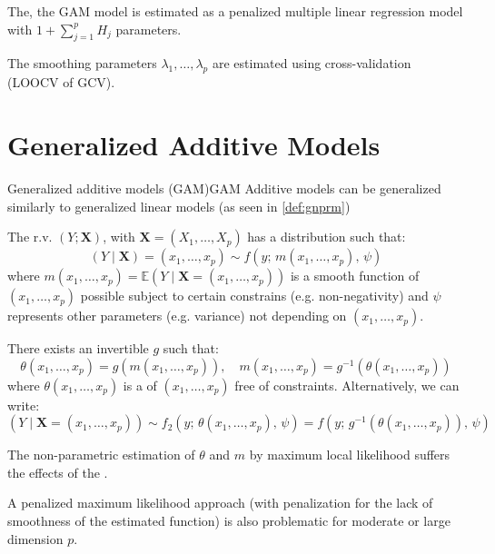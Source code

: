 The, the GAM model is estimated as a penalized multiple linear regression model with
$1 + \sum_{j=1}^p H_j$ parameters.

The smoothing parameters $\lambda_1,\dots,\lambda_p$ are estimated using cross-validation
(LOOCV of GCV).

\section{Generalized Additive Models}

\begin{definition}{Generalized additive models (GAM)}{GAM}
    Additive models can be generalized similarly to generalized linear models
    (as seen in \ref{def:gnprm})

The r.v. $(Y; \boldsymbol X)$, with $\boldsymbol X = (X_1,\dots,X_p)$ has a distribution such
that:
\begin{equation*}
    (Y \mid \boldsymbol X) = (x_1,\dots,x_p) \sim f(y;\,m(x_1, \ldots, x_p),\,\psi)
\end{equation*}
where $m(x_1, \ldots, x_p) = \mathds{E}(Y \mid \boldsymbol X = (x_1,\dots,x_p))$ is a
smooth function of $(x_1,\dots,x_p)$ possible subject to certain constrains (e.g. non-negativity)
and $\psi$ represents other parameters (e.g. variance) not depending on $(x_1,\dots,x_p)$.

There exists an invertible  $g$ such that:
\begin{equation*}
    \theta(x_1,\ldots,x_p) = g(m(x_1,\ldots,x_p)), \quad m(x_1,\ldots,x_p) = g^{-1}(\theta(x_1,\ldots,x_p))
\end{equation*}
where $\theta(x_1,\ldots,x_p)$ is a  of $(x_1,\ldots,x_p)$ free of
constraints.
\tcblower
Alternatively, we can write:
\begin{equation*}
    (Y \mid \boldsymbol X = (x_1,\dots,x_p)) \sim f_2(y;\,\theta(x_1, \ldots, x_p),\,\psi)
    = f(y;\,g^{-1}(\theta(x_1, \ldots, x_p)),\,\psi)
\end{equation*}
\end{definition}

The non-parametric estimation of $\theta$ and $m$ by maximum local
likelihood suffers the effects of the .

A penalized maximum likelihood approach (with penalization for the
lack of smoothness of the estimated function) is also problematic
for moderate or large dimension $p$.

